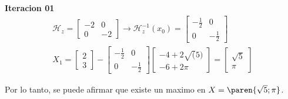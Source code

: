 \begin{homeworkProblem}
\textbf{Iteracion 01}\\
\begin{align*}
\mathcal{H}_z=\begin{bmatrix}
    -2 & 0 \\ 0 & -2
\end{bmatrix} 
\rightarrow
\mathcal{H}_z^{-1}(x_0)=\begin{bmatrix}
    -\frac{1}{2} & 0 \\ 0 & -\frac{1}{2}
\end{bmatrix} \\
X_1=\begin{bmatrix}
    2 \\ 3
\end{bmatrix}-\begin{bmatrix}
    -\frac{1}{2} & 0 \\ 0 & -\frac{1}{2}
\end{bmatrix}\begin{bmatrix}
     -4+2\sqrt(5) \\ -6 + 2\pi
\end{bmatrix}=\begin{bmatrix}
    \sqrt{5} \\ \pi
\end{bmatrix}
\end{align*}

Por lo tanto, se puede afirmar que existe un maximo en $X=\paren{\sqrt{5};\pi}$.



\end{homeworkProblem}